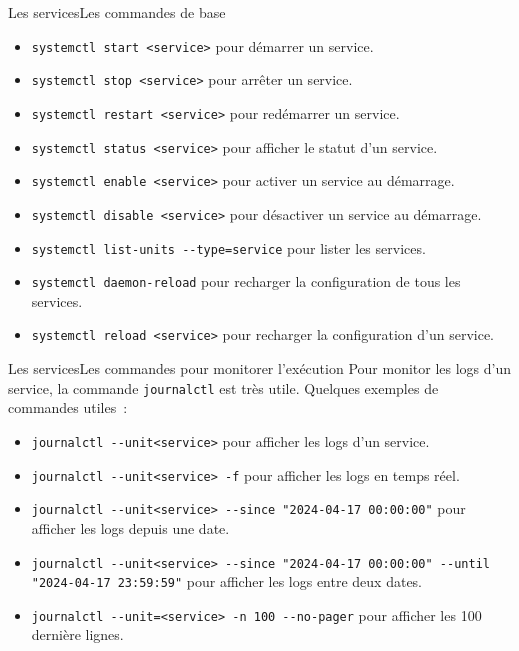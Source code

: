 \documentclass{beamer}
\begin{document}
    \begin{frame}{Les services}{Les commandes de base}
        \begin{itemize}
            \item \lstinline{systemctl start <service>} pour démarrer un service.
            \item \lstinline{systemctl stop <service>} pour arrêter un service.
            \item \lstinline{systemctl restart <service>} pour redémarrer un service.
            \item \lstinline{systemctl status <service>} pour afficher le statut d'un service.
            \item \lstinline{systemctl enable <service>} pour activer un service au démarrage.
            \item \lstinline{systemctl disable <service>} pour désactiver un service au démarrage.
            \item \lstinline{systemctl list-units --type=service} pour lister les services.
            \item \lstinline{systemctl daemon-reload} pour recharger la configuration de tous les services.
            \item \lstinline{systemctl reload <service>} pour recharger la configuration d'un service.
        \end{itemize}
    \end{frame}

    \begin{frame}{Les services}{Les commandes pour monitorer l'exécution}
        Pour monitor les logs d'un service, la commande \lstinline{journalctl} est très utile.
        \bigbreak
        Quelques exemples de commandes utiles~:
        \begin{itemize}
            \item \lstinline{journalctl --unit<service>} pour afficher les logs d'un service.
            \item \lstinline{journalctl --unit<service> -f} pour afficher les logs en temps réel.
            \item \lstinline{journalctl --unit<service> --since "2024-04-17 00:00:00"} pour afficher les logs depuis une date.
            \item \lstinline{journalctl --unit<service> --since "2024-04-17 00:00:00" --until "2024-04-17 23:59:59"} pour afficher les logs entre deux dates.
            \item \lstinline{journalctl --unit=<service> -n 100 --no-pager} pour afficher les 100 dernière lignes.
        \end{itemize}
    \end{frame}
\end{document}
